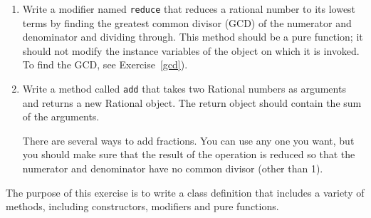 \begin{exercise}
\begin{enumerate}
\item Write a modifier named {\tt reduce} that reduces a rational
  number to its lowest terms by finding the greatest common divisor
  (GCD) of the numerator and denominator and dividing through.
  This method should be a pure function; it should
  not modify the instance variables of the object on which it is
  invoked.  To find the GCD, see Exercise~\ref{gcd}).

\item Write a method called {\tt add} that takes two Rational
numbers as arguments and returns a new Rational object.  The return
object should contain the sum of the arguments.

There are several ways to add fractions.  You can use any one you
want, but you should make sure that the result of the operation is
reduced so that the numerator and denominator have no common divisor
(other than 1).
\end{enumerate}

The purpose of this exercise is to write a class definition that
includes a variety of methods, including constructors, modifiers and
pure functions.
\end{exercise}




